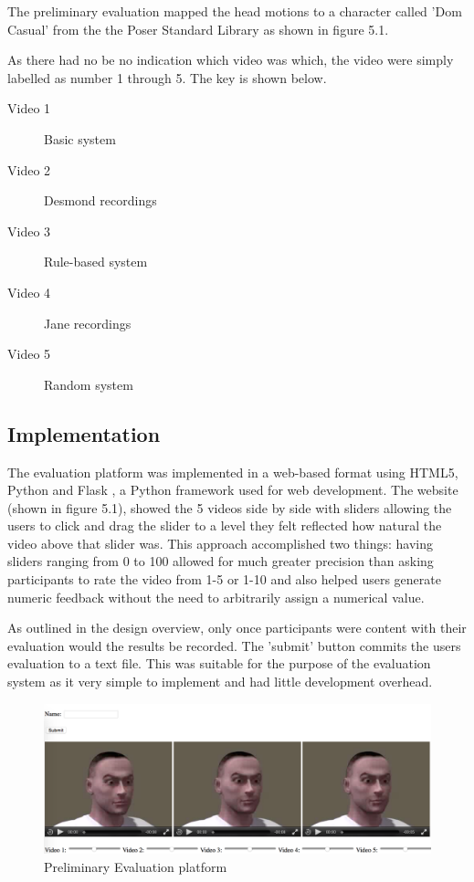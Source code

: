 \documentclass[bsc,frontabs,twoside,singlespacing,parskip]{infthesis}
\begin{document}
The preliminary evaluation mapped the head motions to a character called 'Dom Casual' from the the Poser Standard Library as shown in figure 5.1.

As there had no be no indication which video was which, the video were simply labelled as number 1 through 5. The key is shown below.

\begin{description}
  	\item[Video 1]	Basic system
  	\item[Video 2] Desmond recordings
	\item[Video 3] Rule-based system
	\item[Video 4] Jane recordings
	\item[Video 5] Random system
\end{description}


\subsection{Implementation}

The evaluation platform was implemented in a web-based format using HTML5, Python and Flask \cite{flask}, a Python framework used for web development. The website (shown in figure 5.1), showed the 5 videos side by side with sliders allowing the users to click and drag the slider to a level they felt reflected how natural the video above that slider was. This approach accomplished two things: having sliders ranging from 0 to 100 allowed for much greater precision than asking participants to rate the video from 1-5 or 1-10 and also helped users generate numeric feedback without the need to arbitrarily assign a numerical value.

As outlined in the design overview, only once participants were content with their evaluation would the results be recorded. The 'submit' button commits the users evaluation to a text file. This was suitable for the purpose of the evaluation system as it very simple to implement and had little development overhead.

\begin{figure}
	\centering
	\includegraphics[width=1.0\textwidth]{eval_2.png}
	\caption{Preliminary Evaluation platform}
\end{figure}
\end{document}
